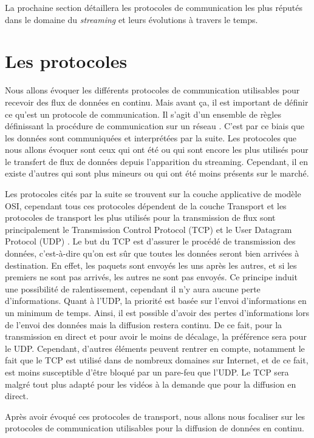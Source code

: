 \documentclass{polytech/polytech}
\begin{document}
La prochaine section détaillera les protocoles de communication les plus réputés dans le domaine du \textit{streaming} et leurs évolutions à travers le temps.


\section{Les protocoles}
\label{sec:protocoles}

Nous allons évoquer les différents protocoles de communication utilisables pour recevoir des flux de données en continu. Mais avant ça, il est important de définir ce qu’est un protocole de communication. Il s’agit d’un ensemble de règles définissant la procédure de communication sur un réseau \cite{_introduction_2017}. C’est par ce biais que les données sont communiquées et interprétées par la suite. Les protocoles que nous allons évoquer sont ceux qui ont été ou qui sont encore les plus utilisés pour le transfert de flux de données depuis l’apparition du streaming. Cependant, il en existe d’autres qui sont plus mineurs ou qui ont été moins présents sur le marché.

Les protocoles cités par la suite se trouvent sur la couche applicative de modèle OSI, cependant tous ces protocoles dépendent de la couche Transport et les protocoles de transport les plus utilisés pour la transmission de flux sont principalement le Transmission Control Protocol (TCP) et le User Datagram Protocol (UDP) \cite{_how_2016}. Le but du TCP est d’assurer le procédé de transmission des données, c’est-à-dire qu’on est sûr que toutes les données seront bien arrivées à destination. En effet, les paquets sont envoyés les uns après les autres, et si les premiers ne sont pas arrivés, les autres ne sont pas envoyés. Ce principe induit une possibilité de ralentissement, cependant il n’y aura aucune perte d’informations. Quant à l’UDP, la priorité est basée sur l’envoi d’informations en un minimum de temps. Ainsi, il est possible d’avoir des pertes d’informations lors de l’envoi des données mais la diffusion restera continu. De ce fait, pour la transmission en direct et pour avoir le moins de décalage, la préférence sera pour le UDP. Cependant, d’autres éléments peuvent rentrer en compte, notamment le fait que le TCP est utilisé dans de nombreux domaines sur Internet, et de ce fait, est moins susceptible d’être bloqué par un pare-feu que l’UDP. Le TCP sera malgré tout plus adapté pour les vidéos à la demande que pour la diffusion en direct.

Après avoir évoqué ces protocoles de transport, nous allons nous focaliser sur les protocoles de communication utilisables pour la diffusion de données en continu.
\end{document}
